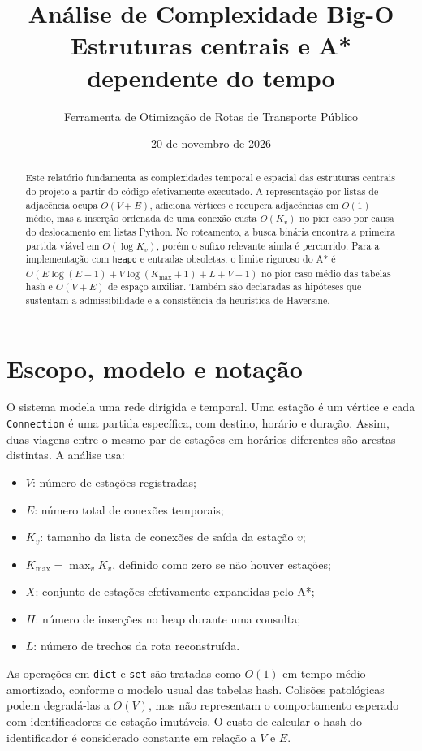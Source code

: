 \documentclass[11pt,a4paper]{article}
\title{\textbf{Análise de Complexidade Big-O}\\[0.4em]
\large Estruturas centrais e A* dependente do tempo}
\author{Ferramenta de Otimização de Rotas de Transporte Público}
\date{20 de novembro de 2026}
\begin{document}
\maketitle

\begin{abstract}
Este relatório fundamenta as complexidades temporal e espacial das estruturas
centrais do projeto a partir do código efetivamente executado. A representação
por listas de adjacência ocupa $O(V+E)$, adiciona vértices e
recupera adjacências em $O(1)$ médio, mas a inserção ordenada de uma conexão
custa $O(K_v)$ no pior caso por causa do deslocamento em listas Python. No
roteamento, a busca binária encontra a primeira partida viável em
$O(\log K_v)$, porém o sufixo relevante ainda é percorrido. Para a implementação
com \texttt{heapq} e entradas obsoletas, o limite rigoroso do A* é
$O(E\log(E+1)+V\log(K_{\max}+1)+L+V+1)$ no pior caso médio das tabelas hash e
$O(V+E)$ de espaço auxiliar. Também são declaradas as hipóteses que sustentam a
admissibilidade e a consistência da heurística de Haversine.
\end{abstract}

\section{Escopo, modelo e notação}

O sistema modela uma rede dirigida e temporal. Uma estação é um vértice e cada
\texttt{Connection} é uma partida específica, com destino, horário e duração.
Assim, duas viagens entre o mesmo par de estações em horários diferentes são
arestas distintas. A análise usa:

\begin{itemize}
  \item $V$: número de estações registradas;
  \item $E$: número total de conexões temporais;
  \item $K_v$: tamanho da lista de conexões de saída da estação $v$;
  \item $K_{\max}=\max_v K_v$, definido como zero se não houver estações;
  \item $X$: conjunto de estações efetivamente expandidas pelo A*;
  \item $H$: número de inserções no heap durante uma consulta;
  \item $L$: número de trechos da rota reconstruída.
\end{itemize}

As operações em \texttt{dict} e \texttt{set} são tratadas como $O(1)$ em
tempo médio amortizado, conforme o modelo usual das tabelas hash. Colisões
patológicas podem degradá-las a $O(V)$, mas não representam o comportamento
esperado com identificadores de estação imutáveis. O custo de calcular o hash
do identificador é considerado constante em relação a $V$ e $E$.
\end{document}
